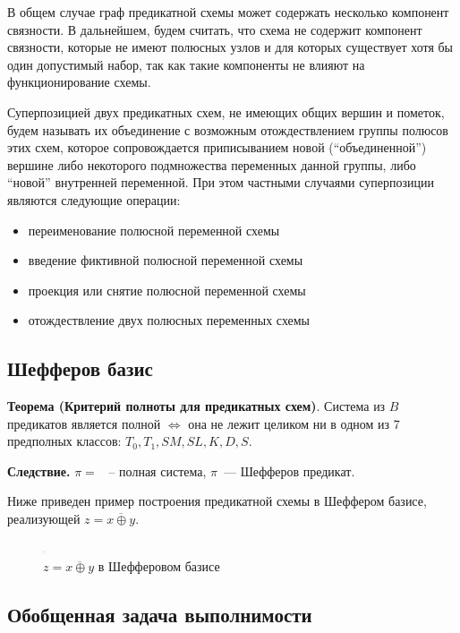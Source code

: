\documentclass[12pt]{article}
\begin{document}
В общем случае граф предикатной схемы может содержать несколько компонент связности. 
В дальнейшем, будем считать, что схема не содержит компонент связности, 
которые не имеют полюсных узлов и для которых существует хотя бы один допустимый набор, так как такие компоненты не влияют на функционирование схемы.

Суперпозицией двух предикатных схем, не имеющих общих вершин и пометок, 
будем называть их объединение с возможным отождествлением группы полюсов этих схем, 
которое сопровождается приписыванием новой (``объединенной'') вершине либо 
некоторого подмножества переменных данной группы, либо ``новой'' внутренней переменной.
 При этом частными случаями суперпозиции являются следующие операции:
\begin{itemize}
\item переименование полюсной переменной схемы

\item введение фиктивной полюсной переменной схемы

\item проекция или снятие полюсной переменной схемы

\item отождествление двух полюсных переменных схемы
\end{itemize}

\subsection{Шефферов базис}

\textbf{Теорема (Критерий полноты для предикатных схем)}. Система из $B$ предикатов является полной $\iff$
она не лежит целиком ни в одном из 7 предполных классов: $T_0, T_1, SM, SL, K, D, S$. \cite{Shu11}

\textbf{Следствие.} $\pi =  $ ~-- полная система, $\pi$~--- Шефферов предикат.

Ниже приведен пример построения предикатной схемы в Шеффером базисе, реализующей $z=\overline{x \oplus y}$.

\begin{figure}[htb]
\centering
\includegraphics[width=0.01\textwidth]{constraint_graph.png}
\caption{$z=\overline{x \oplus y}$ в Шефферовом базисе}
\label{fig:sheff}
\end{figure}

\subsection{Обобщенная задача выполнимости}
\end{document}
